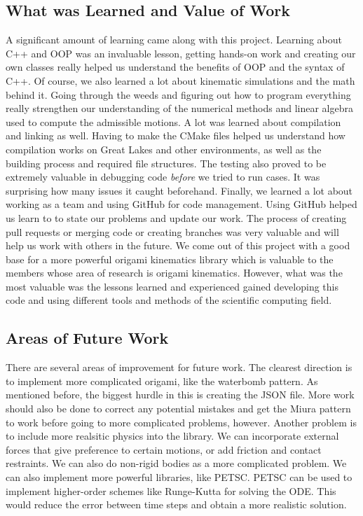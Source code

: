 \subsection{What was Learned and Value of Work}
A significant amount of learning came along with this project. Learning about C++ and OOP was an invaluable lesson, getting hands-on work and creating our own classes really helped us understand the benefits of OOP and the syntax of C++. Of course, we also learned a lot about kinematic simulations and the math behind it. Going through the weeds and figuring out how to program everything really strengthen our understanding of the numerical methods and linear algebra used to compute the admissible motions. A lot was learned about compilation and linking as well. Having to make the CMake files helped us understand how compilation works on Great Lakes and other environments, as well as the building process and required file structures. The testing also proved to be extremely valuable in debugging code \textit{before} we tried to run cases. It was surprising how many issues it caught beforehand. Finally, we learned a lot about working as a team and using GitHub for code management. Using GitHub helped us learn to to state our problems and update our work. The process of creating pull requests or merging code or creating branches was very valuable and will help us work with others in the future. We come out of this project with a good base for a more powerful origami kinematics library which is valuable to the members whose area of research is origami kinematics. However, what was the most valuable was the lessons learned and experienced gained developing this code and using different tools and methods of the scientific computing field.
\subsection{Areas of Future Work}
There are several areas of improvement for future work. The clearest direction is to implement more complicated origami, like the waterbomb pattern. As mentioned before, the biggest hurdle in this is creating the JSON file. More work should also be done to correct any potential mistakes and get the Miura pattern to work before going to more complicated problems, however. Another problem is to include more realsitic physics into the library. We can incorporate external forces that give preference to certain motions, or add friction and contact restraints. We can also do non-rigid bodies as a more complicated problem. We can also implement more powerful libraries, like PETSC. PETSC can be used to implement higher-order schemes like Runge-Kutta for solving the ODE. This would reduce the error between time steps and obtain a more realistic solution.


